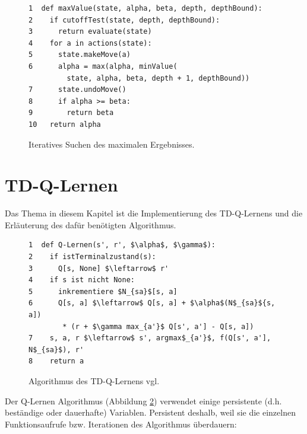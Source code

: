 \begin{figure}[!htbp]
\centering
\begin{lstlisting}[frame=single, mathescape=true]
1  def maxValue(state, alpha, beta, depth, depthBound):
2    if cutoffTest(state, depth, depthBound):
3      return evaluate(state)
4    for a in actions(state):
5      state.makeMove(a)
6      alpha = max(alpha, minValue(
         state, alpha, beta, depth + 1, depthBound))
7      state.undoMove()
8      if alpha >= beta:
9        return beta
10   return alpha
\end{lstlisting}
\caption{Iteratives Suchen des maximalen Ergebnisses.}
\label{fig:Iteratives Suchen des maximalen Ergebnisses}
\end{figure} 

\newpage

\section{TD-Q-Lernen}
Das Thema in diesem Kapitel ist die Implementierung des TD-Q-Lernens und die Erläuterung des dafür benötigten Algorithmus. \\

\begin{figure}[!htbp]
\centering
\begin{lstlisting}[frame=single, mathescape=true]
1  def Q-Lernen(s', r', $\alpha$, $\gamma$):
2    if istTerminalzustand(s):
3      Q[s, None] $\leftarrow$ r'
4    if s ist nicht None:
5      inkrementiere $N_{sa}$[s, a]
6      Q[s, a] $\leftarrow$ Q[s, a] + $\alpha$(N$_{sa}${s, a])
  		* (r + $\gamma max_{a'}$ Q[s', a'] - Q[s, a])
7    s, a, r $\leftarrow$ s', argmax$_{a'}$, f(Q[s', a'], N$_{sa}$), r'
8    return a
\end{lstlisting}
\caption{Algorithmus des TD-Q-Lernens vgl. \cite[974]{Russell}}
\label{fig:TD-Q-Lernen Algorithmus}
\end{figure} 

Der Q-Lernen Algorithmus (Abbildung \ref{fig:TD-Q-Lernen Algorithmus}) verwendet einige persistente (d.h. beständige oder dauerhafte) Variablen. Persistent deshalb, weil sie die einzelnen Funktionsaufrufe bzw. Iterationen des Algorithmus überdauern:
 
